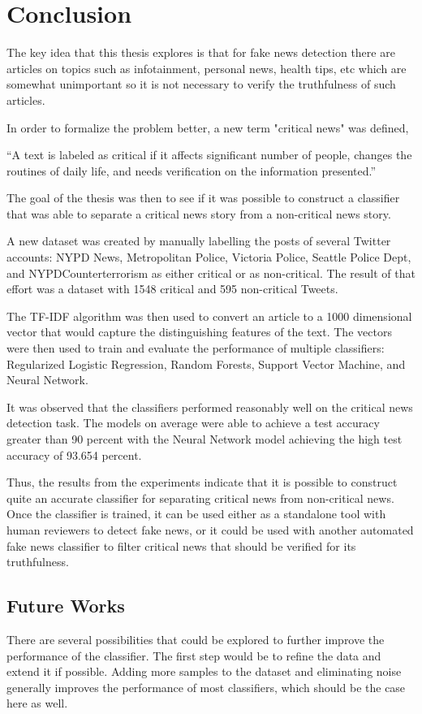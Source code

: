 \chapter{Conclusion}\label{conclusion}
The key idea that this thesis explores is that for fake news detection there are articles on topics such as infotainment, personal news, health tips, etc which are somewhat unimportant so it is not necessary to verify the truthfulness of such articles.

In order to formalize the problem better, a new term "critical news" was defined,

\enquote{A text is labeled as critical if it affects significant number of people, changes the routines of daily life, and needs verification on the information presented.}

The goal of the thesis was then to see if it was possible to construct a classifier that was able to separate a critical news story from a non-critical news story.

A new dataset was created by manually labelling the posts of several Twitter accounts: NYPD News, Metropolitan Police, Victoria Police, Seattle Police Dept, and NYPDCounterterrorism as either critical or as non-critical. The result of that effort was a dataset with 1548 critical and 595 non-critical Tweets.

The TF-IDF algorithm was then used to convert an article to a 1000 dimensional vector that would capture the distinguishing features of the text. The vectors were then used to train and evaluate the performance of multiple classifiers: Regularized Logistic Regression, Random Forests, Support Vector Machine, and Neural Network.

It was observed that the classifiers performed reasonably well on the critical news detection task. The models on average were able to achieve a test accuracy greater than 90 percent with the Neural Network model achieving the high test accuracy of 93.654 percent.

Thus, the results from the experiments indicate that it is possible to construct quite an accurate classifier for separating critical news from non-critical news. Once the classifier is trained, it can be used either as a standalone tool with human reviewers to detect fake news, or it could be used with another automated fake news classifier to filter critical news that should be verified for its truthfulness.

\section{Future Works}
There are several possibilities that could be explored to further improve the performance of the classifier. The first step would be to refine the data and extend it if possible. Adding more samples to the dataset and eliminating noise generally improves the performance of most classifiers, which should be the case here as well.

